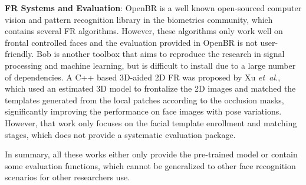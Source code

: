 \documentclass{article}
\newcommand{\latinphrase}[1]{\textit{#1}}
\newcommand{\etal}{\latinphrase{et~al.}\xspace}
\begin{document}
\noindent \textbf{FR Systems and Evaluation}: OpenBR \cite{Klontz_2013_14723} is a well known open-sourced computer vision and pattern recognition library in the biometrics community, which contains several FR algorithms.
However, these algorithms only work well on frontal controlled faces and the evaluation provided in OpenBR is not user-friendly.
Bob \cite{Anjos_2012_190717, Anjos_2017_090117} is another toolbox that aims to reproduce the research in signal processing and machine learning, but is difficult to install due to a large number of dependencies.
A C++ based 3D-aided 2D FR was proposed by Xu \etal \cite{Xu_2017_17643}, which used an estimated 3D model to frontalize the 2D images and matched the templates generated from the local patches according to the occlusion masks, significantly improving the performance on face images with pose variations.
However, that work only focuses on the facial template enrollment and matching stages, which does not provide a systematic evaluation package.

In summary, all these works either only provide the pre-trained model or contain some evaluation functions, which cannot be generalized to other face recognition scenarios for other researchers use.
\end{document}
